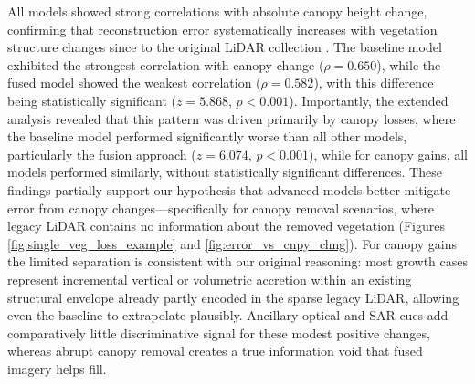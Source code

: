 \documentclass[remotesensing,article,accept,pdftex,moreauthors]{Definitions/mdpi}
\begin{document}
All models showed strong correlations with absolute canopy height change, confirming that reconstruction error systematically increases with vegetation structure changes since to the original LiDAR collection%
. The baseline model exhibited the strongest correlation with canopy change ($\rho=0.650$), while the fused model showed the weakest correlation ($\rho=0.582$), with this difference being statistically significant ($z=5.868$, $p<0.001$). Importantly, the extended analysis revealed that this pattern was driven primarily by canopy losses, where the baseline model performed significantly worse than all other models, particularly the fusion approach ($z=6.074$, $p<0.001$), while for canopy gains, all models performed similarly, without statistically significant differences. These findings partially support our hypothesis that advanced models better mitigate error from canopy changes---specifically for canopy removal scenarios, where legacy LiDAR contains no information about the removed vegetation (Figures \ref{fig:single_veg_loss_example} and \ref{fig:error_vs_cnpy_chng}). For canopy gains the limited separation is consistent with our original reasoning: most growth cases represent incremental vertical or volumetric accretion within an existing structural envelope already partly encoded in the sparse legacy LiDAR, allowing even the baseline to extrapolate plausibly. Ancillary optical and SAR cues add comparatively little discriminative signal for these modest positive changes, whereas abrupt canopy removal creates a true information void that fused imagery helps fill.


\vspace{-3pt}
\end{document}
